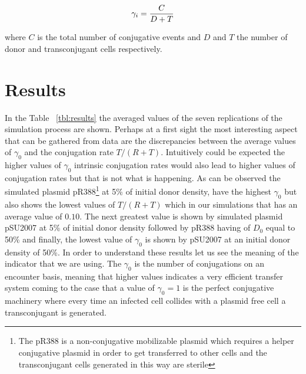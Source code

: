 \begin{equation}
\label{eq:gammai}
\centering 
\gamma_i= \frac{C}{D + T}
\end{equation}

where $C$ is the total number of conjugative events and $D$ and $T$ the number of donor and transconjugant cells respectively.


\section{Results}

In the Table ~\ref{tbl:results} the averaged values of the seven replications of the simulation process are shown. Perhaps at a first sight the most interesting aspect that can be gathered from data are the discrepancies between the average values of $\gamma_0$ and the conjugation rate $T/(R+T)$. Intuitively could be expected the higher values of $\gamma_0$ intrinsic conjugation rates   would also lead to higher values of conjugation rates but that is not what is happening.  As can be observed the simulated plasmid pR388\footnote{The pR388 is a non-conjugative mobilizable plasmid which requires a helper conjugative plasmid in order to get transferred to other cells and the transconjugant cells generated in this way are sterile} at 5\% of initial donor density, have the highest $\gamma_0$ but also shows the lowest values of $T/(R+T)$  which in our simulations that has an average value of $0.10$. The next greatest value is shown by simulated plasmid pSU2007 at 5\% of initial donor density followed by pR388 having of $D_0$ equal to 50\% and finally, the lowest value of $\gamma_0$ is shown by pSU2007 at an initial donor density of 50\%. In order to understand these results let us see the meaning of the indicator that we are using. The $\gamma_0$ is the number of conjugations on an encounter basis, meaning that higher values indicates a very efficient transfer system coming to the case that a value of $\gamma_0 = 1$ is the perfect conjugative machinery where every time an infected cell  collides with a plasmid free cell a transconjugant is generated. 

